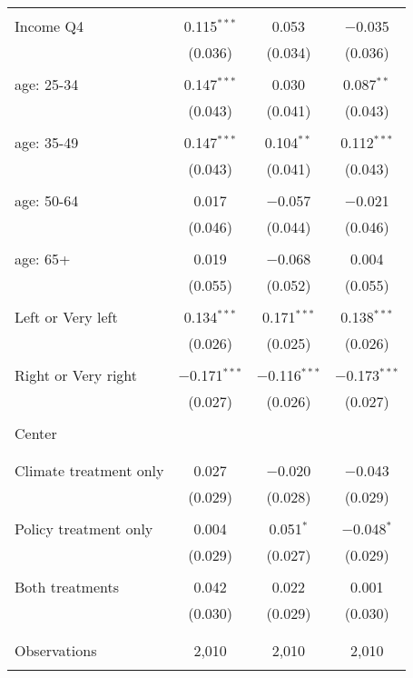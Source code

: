 \begin{tabular}{@{\extracolsep{5pt}}lccc}
  & & & \\ 
 Income Q4 & 0.115$^{***}$ & 0.053 & $-$0.035 \\ 
  & (0.036) & (0.034) & (0.036) \\ 
  & & & \\ 
 age: 25-34 & 0.147$^{***}$ & 0.030 & 0.087$^{**}$ \\ 
  & (0.043) & (0.041) & (0.043) \\ 
  & & & \\ 
 age: 35-49 & 0.147$^{***}$ & 0.104$^{**}$ & 0.112$^{***}$ \\ 
  & (0.043) & (0.041) & (0.043) \\ 
  & & & \\ 
 age: 50-64 & 0.017 & $-$0.057 & $-$0.021 \\ 
  & (0.046) & (0.044) & (0.046) \\ 
  & & & \\ 
 age: 65+ & 0.019 & $-$0.068 & 0.004 \\ 
  & (0.055) & (0.052) & (0.055) \\ 
  & & & \\ 
 Left or Very left & 0.134$^{***}$ & 0.171$^{***}$ & 0.138$^{***}$ \\ 
  & (0.026) & (0.025) & (0.026) \\ 
  & & & \\ 
 Right or Very right & $-$0.171$^{***}$ & $-$0.116$^{***}$ & $-$0.173$^{***}$ \\ 
  & (0.027) & (0.026) & (0.027) \\ 
  & & & \\ 
 Center &  &  &  \\ 
  &  &  &  \\ 
  & & & \\ 
 Climate treatment only & 0.027 & $-$0.020 & $-$0.043 \\ 
  & (0.029) & (0.028) & (0.029) \\ 
  & & & \\ 
 Policy treatment only & 0.004 & 0.051$^{*}$ & $-$0.048$^{*}$ \\ 
  & (0.029) & (0.027) & (0.029) \\ 
  & & & \\ 
 Both treatments & 0.042 & 0.022 & 0.001 \\ 
  & (0.030) & (0.029) & (0.030) \\ 
  & & & \\ 
\hline \\[-1.8ex] 

Observations & 2,010 & 2,010 & 2,010 \\ 
\hline 
\hline \\[-1.8ex] 
\end{tabular} 